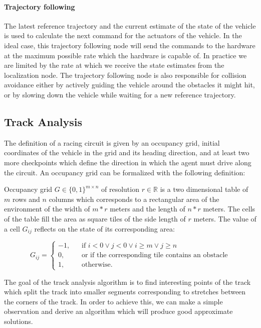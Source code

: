 \paragraph{Trajectory following} The latest reference trajectory and the current estimate of the state of the vehicle is used to calculate the next command for the actuators of the vehicle. In the ideal case, this trajectory following node will send the commands to the hardware at the maximum possible rate which the hardware is capable of. In practice we are limited by the rate at which we receive the state estimates from the localization node. The trajectory following node is also responsible for collision avoidance either by actively guiding the vehicle around the obstacles it might hit, or by slowing down the vehicle while waiting for a new reference trajectory.

\subsection{Track Analysis}

The definition of a racing circuit is given by an occupancy grid, initial coordinates of the vehicle in the grid and its heading direction, and at least two more checkpoints which define the direction in which the agent must drive along the circuit. An occupancy grid can be formalized with the following definition:

\begin{defn}\label{def:occupancy_grid}
    Occupancy grid $G\in\{0, 1\}^{m\times n}$ of resolution $r\in\mathbb{R}$ is a two dimensional table of $m$ rows and $n$ columns which corresponds to a rectangular area of the environment of the width of $m * r$ meters and the length of $n * r$ meters. The cells of the table fill the area as square tiles of the side length of $r$ meters. The value of a cell $G_{ij}$ reflects on the state of its corresponding area:
    
\[
G_{ij} =
     \begin{cases}
       -1\text{,} &\quad\text{if } i < 0 \vee j < 0 \vee i \geq m \vee j \geq n\\
       0\text{,} &\quad\text{or if the corresponding tile contains an obstacle} \\
       1\text{,} &\quad\text{otherwise.}
     \end{cases}
\]
\end{defn}

The goal of the track analysis algorithm is to find interesting points of the track which split the track into smaller segments corresponding to stretches between the corners of the track. In order to achieve this, we can make a simple observation and derive an algorithm which will produce good approximate solutions.

